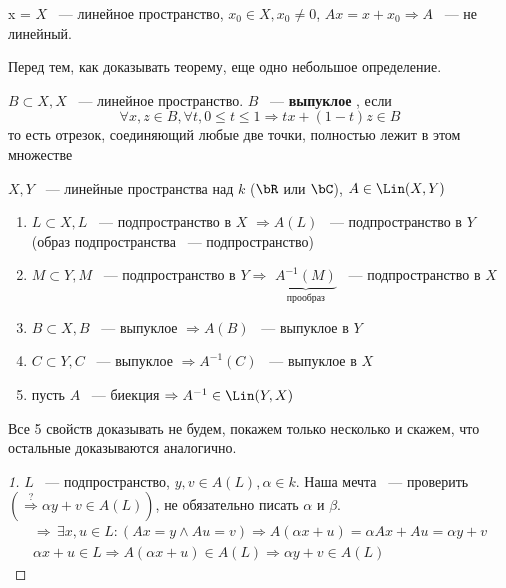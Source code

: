 \documentclass[document]{subfiles}
\begin{document}
\begin{example}x =
    $X$ ~--- линейное пространство, $x_0 \in X, x_0 \ne 0$, $Ax = x + x_0 \Rightarrow A$ ~--- не линейный.
\end{example}
 
Перед тем, как доказывать теорему, еще одно небольшое определение.
\begin{definition}
    $B \subset X, X$ ~--- линейное пространство. $B$ ~--- \textbf{ выпуклое }, если 
    \[ \forall x,z \in B, \forall t, 0 \leq t \leq 1 \Rightarrow tx + (1-t)z \in B \]
    то есть отрезок, соединяющий любые две точки, полностью лежит в этом множестве
\end{definition}
 
\begin{theorem}
    $X,Y$ ~--- линейные пространства над $k$ ($\bR$ или $\bC$), $A \in \Lin(X,Y)$
    \begin{enumerate}
        \item $L \subset X, L$ ~--- подпространство в $X$ $\Rightarrow A(L)$ ~--- подпространство в $Y$ (образ подпространства ~--- подпространство)
        \item $M \subset Y, M$ ~--- подпространство в $Y \Rightarrow$ $\underbrace{A^{-1}(M)}_{\text{прообраз}}$ ~--- подпространство в $X$
        \item $B \subset X, B$ ~--- выпуклое $\Rightarrow A(B)$ ~--- выпуклое в $Y$
        \item $C \subset Y, C$ ~--- выпуклое $\Rightarrow A^{-1}(C)$ ~--- выпуклое в $X$
        \item пусть $A$ ~--- биекция $\Rightarrow A^{-1} \in \Lin(Y,X)$
    \end{enumerate}
\end{theorem}
Все 5 свойств доказывать не будем, покажем только несколько и скажем, что остальные доказываются аналогично.
\begin{proof}[1]
    $L$ ~--- подпространство, $y,v \in A(L), \alpha \in k$. Наша мечта ~--- проверить $(\stackrel{?}{\Rightarrow} \alpha y + v \in A(L))$, не обязательно писать $\alpha$ и $\beta$.
    \begin{gather*}
        \Rightarrow \, \exists x,u \in L : (Ax = y \land Au = v) \Rightarrow A(\alpha x + u) = \alpha A x + A u = \alpha y + v \\
        \alpha x + u \in L \Rightarrow A(\alpha x + u) \in A(L) \Rightarrow \alpha y + v \in A(L)
    \end{gather*}
\end{proof}
 
\end{document}
